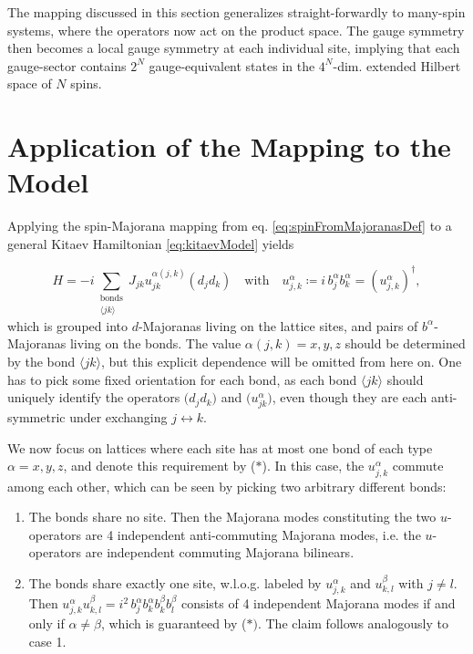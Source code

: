 \documentclass[%
fontsize=12pt, %
twoside=off %
]{scrbook}
\begin{document}
The mapping discussed in this section generalizes straight-forwardly to many-spin systems, where the operators now act on the product space. The gauge symmetry then becomes a local gauge symmetry at each individual site, implying that each gauge-sector contains $2^N$ gauge-equivalent states in the $4^N$-dim. extended Hilbert space of $N$ spins.


\section{Application of the Mapping to the Model}
\label{sec:applicationOfMappingToModel}
Applying the spin-Majorana mapping from eq. \ref{eq:spinFromMajoranasDef} to a general Kitaev Hamiltonian \ref{eq:kitaevModel} yields 

\begin{equation}
H = -i \sum_{\substack{\text{bonds} \\ \langle jk\rangle }}  J_{jk} u^{\alpha(j,k)}_{jk} \left( d_j d_k\right)\quad\text{with}\quad u_{j,k}^\alpha\coloneq i\,b_j^\alpha b_k^\alpha = \left(u_{j,k}^\alpha\right)^\dagger,
\label{eq:kitaevModelMappedToMajoranas}
\end{equation}
which is grouped into $d$-Majoranas living on the lattice sites, and pairs of $b^\alpha$-Majoranas living on the bonds. The value $\alpha(j,k)=x,y,z$ should be determined by the bond $\langle jk\rangle$, but this explicit dependence will be omitted from here on. One has to pick some fixed orientation for each bond, as each bond $\langle jk\rangle$ should uniquely identify the operators $\Big(d_jd_k\Big)$ and $\Big(u_{jk}^\alpha\Big)$, even though they are each anti-symmetric under exchanging $j \leftrightarrow k$.

We now focus on lattices where each site has at most one bond of each type $\alpha=x,y,z$, and denote this requirement by ($\ast$). In this case, the $u_{j,k}^\alpha$ commute among each other, which can be seen by picking two arbitrary different bonds:
\begin{enumerate}
	\item[Case 1:]The bonds share no site. Then the Majorana modes constituting the two $u$-operators are 4 independent anti-commuting Majorana modes, i.e. the $u$-operators are independent commuting Majorana bilinears.
	\item[Else:]The bonds share exactly one site, w.l.o.g. labeled by $u_{j,k}^\alpha$ and $u_{k,l}^\beta$ with $j\neq l$. Then $u_{j,k}^\alpha u_{k,l}^\beta = i^2 \, b_j^\alpha b_k^\alpha b_k^\beta b_l^\beta $ consists of 4 independent Majorana modes if and only if $\alpha \neq \beta$, which is guaranteed by ($\ast)$. The claim follows analogously to case 1.
\end{enumerate}
\end{document}
